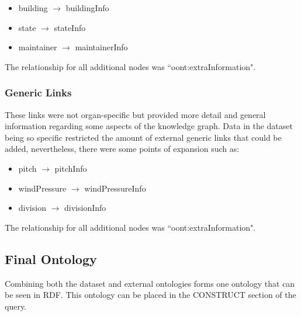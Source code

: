 \vspace{-0.15cm}
\begin{itemize}
    \itemsep0em 
    \vspace{-0.05cm}
    \item building $\rightarrow$ buildingInfo
    \vspace{-0.05cm}
    \item state $\rightarrow$ stateInfo
    \vspace{-0.05cm}
    \item maintainer $\rightarrow$ maintainerInfo
    \vspace{-0.05cm}
\end{itemize}
\vspace{-0.1cm}

\noindent The relationship for all additional nodes was ``oont:extraInformation".

\subsubsection{Generic Links}
\hspace*{0.5cm} These links were not organ-specific but provided more detail and general information regarding some aspects of the knowledge graph. Data in the dataset being so specific restricted the amount of external generic links that could be added, nevertheless, there were some points of expansion such as:

\vspace{-0.15cm}
\begin{itemize}
    \itemsep0em 
    \vspace{-0.05cm}
    \item pitch $\rightarrow$ pitchInfo
    \vspace{-0.05cm}
    \item windPressure $\rightarrow$ windPressureInfo
    \vspace{-0.05cm}
    \item division $\rightarrow$ divisionInfo
    \vspace{-0.1cm}
\end{itemize}
\vspace{-0.1cm}

\noindent The relationship for all additional nodes was ``oont:extraInformation".

\subsection{Final Ontology}
\hspace*{0.5cm} Combining both the dataset and external ontologies forms one ontology that can be seen in RDF. This ontology can be placed in the CONSTRUCT section of the query.

